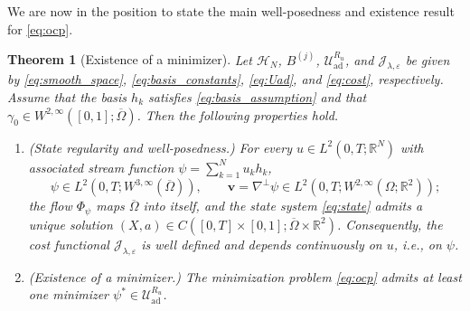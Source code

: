 \documentclass[12pt, reqno]{amsart}
\theoremstyle{plain}
\newtheorem{thm}{Theorem}[section]
\theoremstyle{definition}
\numberwithin{equation}{section}
\numberwithin{figure}{section}
\numberwithin{algorithm}{section}
\begin{document}
We are now in the position to state the main well-posedness and existence result for \eqref{eq:ocp}.



\begin{thm}[Existence of a minimizer]\label{prop:H3}
Let $\mathcal H_N$, $B^{(j)}$, $\mathcal U_{\mathrm{ad}}^{R_u}$, and $\mathcal J_{\lambda,\varepsilon}$ be given by \eqref{eq:smooth_space}, \eqref{eq:basis_constants}, \eqref{eq:Uad}, and \eqref{eq:cost}, respectively. Assume that the basis $h_k$ satisfies \eqref{eq:basis_assumption} and that $\gamma_0\in W^{2,\infty}([0,1];\overline\Omega)$. Then the following properties hold.
\begin{enumerate}
\item[\textup{(i)}]\emph{(State regularity and well-posedness.)} For every $u\in L^2(0,T;\mathbb R^N)$ with associated stream function $\psi=\sum_{k=1}^N u_k h_k$,
\begin{equation}\label{eq:v_reg}
\psi\in L^2(0,T;W^{3,\infty}(\overline\Omega)),\qquad
\mathbf v=\nabla^\perp\psi\in L^2(0,T;W^{2,\infty}(\Omega;\mathbb R^2));
\end{equation}
the flow $\Phi_\psi$ maps $\overline\Omega$ into itself, and the state system  \eqref{eq:state} admits a unique solution $(X,a)\in C([0,T]\times[0,1];\overline\Omega\times\mathbb R^2)$. Consequently, the cost functional $\mathcal{J}_{\lambda,\varepsilon}$ is well defined and depends continuously on $u$, i.e., on  $\psi$.
\item[\textup{(ii)}]\emph{(Existence of a minimizer.)} The minimization problem \eqref{eq:ocp} admits at least one minimizer $\psi^*\in\mathcal U_{\mathrm{ad}}^{R_u}$.
\end{enumerate}
\end{thm}
\end{document}

